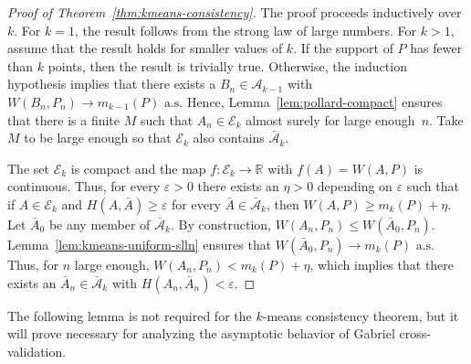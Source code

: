 \documentclass[11pt]{article}
\newcommand{\R}{\mathbb{R}}
\newcommand{\sA}{\mathcal{A}}
\newcommand{\sbA}{\mathcal{\bar A}}
\newcommand{\sE}{\mathcal{E}}
\begin{document}
\begin{proof}[Proof of Theorem~\ref{thm:kmeans-consistency}]
The proof proceeds inductively over $k$.  For $k=1$, the result follows from
the strong law of large numbers.  For $k > 1$, assume that the result holds
for smaller values of $k$.  If the support of $P$ has fewer than $k$ points,
then the result is trivially true.  Otherwise, the induction hypothesis
implies that there exists a $B_n \in \sA_{k-1}$ with $W(B_n, P_n) \to
m_{k-1}(P)\text{ a.s.}$  Hence, Lemma~\ref{lem:pollard-compact} ensures that
there is a finite $M$ such that $A_n \in \sE_k$ almost surely for large
enough~$n$.  Take $M$ to be large enough so that $\sE_k$ also contains
$\sbA_k$.


The set $\sE_k$ is compact and the map $f: \sE_k \to \R$ with $f(A) =
W(A, P)$ is continuous.  Thus, for every $\varepsilon > 0$ there exists an
$\eta > 0$ depending on $\varepsilon$ such that if $A \in \sE_k$ and $H(A,
\bar A) \geq \varepsilon$ for every $\bar A \in \sbA_k$, then $W(A,P) \geq
m_{k}(P) + \eta$.  Let $\bar A_0$ be any member of $\sbA_k$.  By construction,
$W(A_n, P_n) \leq W(\bar A_0, P_n)$.  Lemma~\ref{lem:kmeans-uniform-slln}
ensures that $W(\bar A_0, P_n) \to m_k(P)\text{ a.s.}$  Thus, for $n$ large
enough, $W(A_n, P_n) < m_{k}(P) + \eta$, which implies that there exists an
$\bar A_n \in \sbA_k$ with $H(A_n, \bar A_n) < \varepsilon$.
\end{proof}


The following lemma is not required for the $k$-means consistency theorem, but
it will prove necessary for analyzing the asymptotic behavior of Gabriel
cross-validation.
\end{document}
